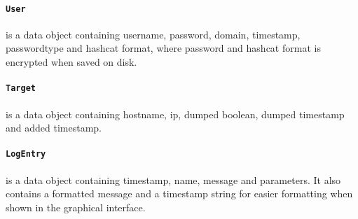 \documentclass{article}
\begin{document}
\paragraph{\texttt{User}} is a data object containing username, password, domain, timestamp, passwordtype and hashcat format, where password and hashcat format is encrypted when saved on disk.
\paragraph{\texttt{Target}} is a data object containing hostname, ip, dumped boolean, dumped timestamp and added timestamp.
\paragraph{\texttt{LogEntry}} is a data object containing timestamp, name, message and parameters. It also contains a formatted message and a timestamp string for easier formatting when shown in the graphical interface.
\end{document}
